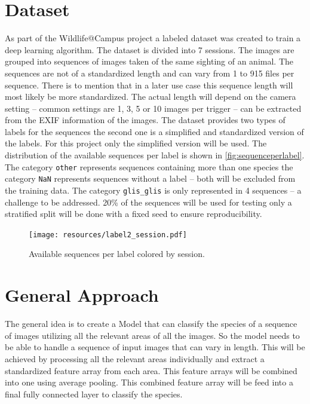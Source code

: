 \documentclass{article}
\begin{document}
\section*{Dataset} %

As part of the Wildlife@Campus project a labeled dataset was created to train a deep learning algorithm.
The dataset is divided into 7 sessions. The images are grouped into sequences of images taken of the same sighting 
of an animal. The sequences are not of a standardized length and can vary from 1 to 915 files per sequence.
There is to mention that in a later use case this sequence length will most likely be more standardized.
The actual length will depend on the camera setting -- common settings are 1, 3, 5 or 10 images per trigger -- 
can be extracted from the EXIF information of the images. The dataset provides two types of labels for the sequences 
the second one is a simplified and standardized version of the labels. For this project only the simplified version 
will be used. The distribution of the available sequences per label is shown in \autoref{fig:sequenceperlabel}.
The category \texttt{other} represents sequences containing more than one species the category \texttt{NaN} 
represents sequences without a label -- both will be excluded from the training data. 
The category \texttt{glis\_glis} is only represented in 4 sequences -- a challenge to be addressed.
20\% of the sequences will be used for testing only a stratified split will be done with a fixed seed to ensure
reproducibility.

\begin{figure}[ht]
  \centering
  \texttt{[image: resources/label2\_session.pdf]}
  \caption{Available sequences per label colored by session.}
  \label{fig:sequenceperlabel}
\end{figure}

\section*{General Approach} %

The general idea is to create a Model that can classify the species of a sequence of images utilizing all the relevant 
areas of all the images. So the model needs to be able to handle a sequence of input images that can vary in length. 
This will be achieved by processing all the relevant areas individually and extract a standardized feature array from 
each area. This feature arrays will be combined into one using average pooling. This combined feature array
will be feed into a final fully connected layer to classify the species.
\end{document}
